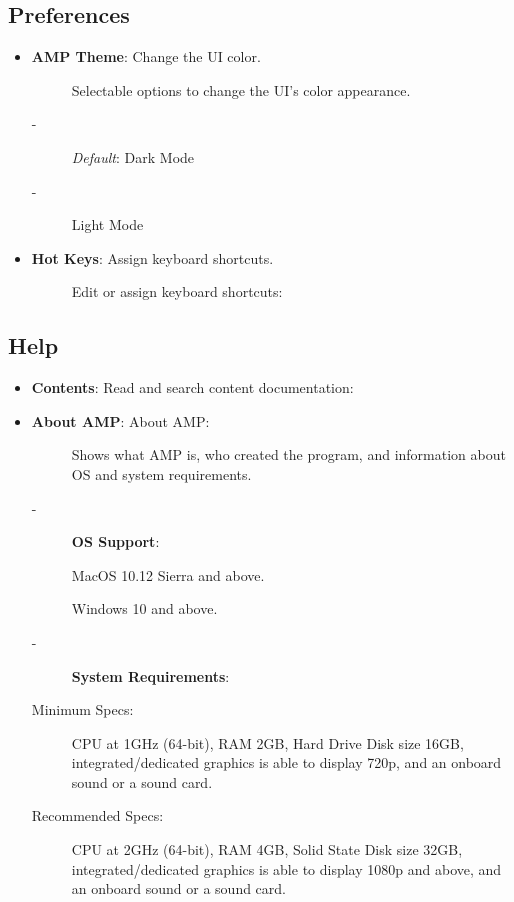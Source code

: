 \documentclass{article}
\begin{document}
\subsection{Preferences}

\begin{itemize}
    \item \textbf{AMP Theme}: Change the UI color.
    \begin{description}
        \item[] Selectable options to change the UI's color appearance.
            \item[-] \textit{Default}: Dark Mode
            \item[-] Light Mode
    \end{description}
    \item \textbf{Hot Keys}: Assign keyboard shortcuts.
    \begin{description}
        \item[] Edit or assign keyboard shortcuts: 
    \end{description}
\end{itemize}

\subsection{Help}

\begin{itemize}
    \item \textbf{Contents}: Read and search content documentation: 
    \item \textbf{About AMP}: About AMP: 
    \begin{description}
        \item[] Shows what AMP is, who created the program, and information about OS and system requirements.
        \item[-] \textbf{OS Support}:
            \item[]  MacOS 10.12 Sierra and above.
            \item[]  Windows 10 and above.
        \item[-] \textbf{System Requirements}:
            \item[Minimum Specs:] CPU at 1GHz (64-bit), RAM 2GB, Hard Drive Disk size 16GB, integrated/dedicated graphics is able to display 720p, and an onboard sound or a sound card.
            \item[Recommended Specs:] CPU at 2GHz (64-bit), RAM 4GB, Solid State Disk size 32GB, integrated/dedicated graphics is able to display 1080p and above, and an onboard sound or a sound card.
    \end{description}
\end{itemize}
\end{document}
